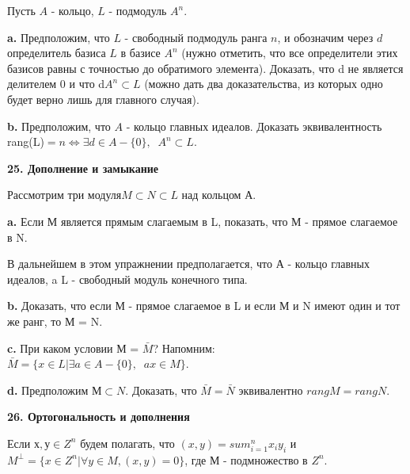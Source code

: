 \medskip

Пусть $A$ - кольцо, $L$ - подмодуль $A^n$. 

\medskip

{\bf a.} Предположим, что $L$ - свободный подмодуль ранга $n$, и 
обозначим через $d$ определитель базиса $L$ в базисе $A^n$ (нужно отметить, 
что все определители этих базисов равны с точностью до 
обратимого элемента). Доказать, что d не является делителем 0 и что d$A^n \subset L$ 
(можно дать два доказательства, из которых одно будет верно лишь 
для главного случая). 

\medskip

{\bf b.} Предположим, что $A$ - кольцо главных идеалов. Доказать 
эквивалентность rang(L)$ = n\Longleftrightarrow \exists d \in A - \{0\}, \;\;A^n \subset L .$

\pagebreak


{\noindent\bf25. Дополнение и замыкание }

\medskip

Рассмотрим три модуля$ M \subset N \subset L$ над кольцом А. 

\medskip

{\bf a.} Если М является прямым слагаемым в L, показать, что М - 
прямое слагаемое в N. 

\medskip

В дальнейшем в этом упражнении предполагается, что А - кольцо 
главных идеалов, a L - свободный модуль конечного типа. 

\medskip

{\bf b.} Доказать, что если М - прямое слагаемое в L и если М и N 
имеют один и тот же ранг, то М = N. 

\medskip 

{\bf c.} При каком условии М = $\bar{M}$? Напомним: \\
$\bar{M}= \{x \in L|\exists a\in A - \{0\},\;\;ax\in M\}  $. 

\medskip

{\bf d.} Предположим $М \subset N$. Доказать, что $ \bar{M}=\bar{N}$ эквивалентно $rang M = rang N$. \\

\medskip

{\noindent\bf26. Ортогональность и дополнения}

\medskip

Если $х,у\in Z^n $ будем полагать, что $(x,y)=sum^{n}_{i=1}x_iy_i $ и 
$M^{\bot} = \{x \in Z^n|\forall y\in M, (x,y)=0\}$, где М - подмножество в $Z^n$. 

\medskip

